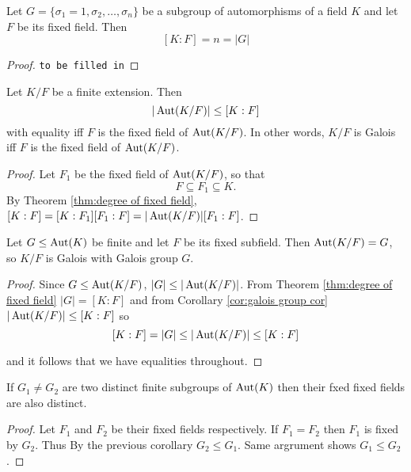\documentclass[a4paper]{article}
\begin{document}
\begin{thm}\label{thm:degree of fixed field}
  Let $G = \{\sigma_1=1, \sigma_2,\ldots, \sigma_n\}$ be a subgroup of automorphisms of a field $K$ and let $F$ be its fixed field. Then
  \[ [K:F] = n = |G| \]
\end{thm}

\begin{proof}
  \texttt{to be filled in}
\end{proof}

\begin{cor}
  \label{cor:upper bound of order of aut group}
  Let $K/F$ be a finite extension. Then
  \[ |\operatorname{Aut}(K/F)| \leq [K:F] \]
  with equality iff $F$ is the fixed field of $\operatorname{Aut}(K/F)$. In other words, $K/F$ is Galois iff $F$ is the fixed field of $\operatorname{Aut}(K/F)$.
\end{cor}

\begin{proof}
  Let $F_1$ be the fixed field of $\operatorname{Aut}(K/F)$, so that
  \[ F \subseteq F_1 \subseteq K. \]
  By Theorem \ref{thm:degree of fixed field}, $[K:F] = [K:F_1][F_1:F] = |\operatorname{Aut}(K/F)| [F_1:F]$.
\end{proof}

\begin{cor}\label{cor:galois group cor}
  Let $G \leq \operatorname{Aut}(K)$ be finite and let $F$ be its fixed subfield. Then $\operatorname{Aut}(K/F) = G$, so $K/F$ is Galois with Galois group $G$.
\end{cor}

\begin{proof}
  Since $G \leq \operatorname{Aut}(K/F)$, $|G| \leq |\operatorname{Aut}(K/F)|$. From Theorem \ref{thm:degree of fixed field} $|G| = [K:F]$ and from Corollary \ref{cor:galois group cor} $|\operatorname{Aut}(K/F)| \leq [K:F]$ so
  \[ [K:F] = |G| \leq |\operatorname{Aut}(K/F)| \leq [K:F] \]

  and it follows that we have equalities throughout.
\end{proof}

\begin{cor}
  \label{cor:unique fixed field}
  If $G_1 \neq G_2$ are two distinct finite subgroups of $\operatorname{Aut}(K)$ then their fxed fixed fields are also distinct.
\end{cor}

\begin{proof}
  Let $F_1$ and $F_2$ be their fixed fields respectively. If $F_1 = F_2$ then $F_1$ is fixed by $G_2$. Thus By the previous corollary $G_2 \leq G_1$. Same argrument shows $G_1 \leq G_2$.
\end{proof}
\end{document}
